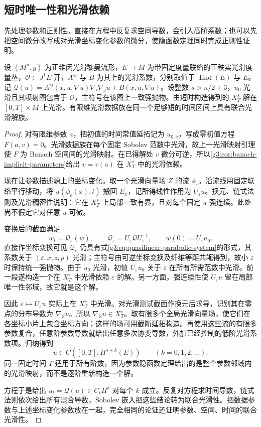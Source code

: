 \subsection{短时唯一性和光滑依赖}
\label{g3:subsec:2602:03}
先处理参数和正则性。直接在方程中反复求空间导数，会引入高阶系数；也可以先把空间微分改写成对光滑坐标变化参数的微分，使隐函数定理同时完成正则性证明。

\begin{lemma}\label{g3:lem:parabolic-parameter-regularity}
	设 \((M^n,\bar g)\) 为正维闭光滑黎曼流形，\(E\to M\) 为带固定度量联络的正秩实光滑度量丛，\(\mathcal O\subset J^1E\) 开，\(A^{ij}\) 与 \(B\) 为其上的光滑系数，分别取值于 \(\operatorname{End}(E)\) 与 \(E\)。记 \(\mathcal Q(u)=A^{ij}(x,u,\nabla u)\nabla_i\nabla_ju+B(x,u,\nabla u)\)。设整数 \(s>n/2+3\)，\(u_0\) 光滑且其喷射图包含于 \(\mathcal O\)，主符号在该图上一致强抛物。由短时构造得到的 \(X_T^s\) 解在 \([0,T]\times M\) 上光滑。有限维光滑数据族在同一个足够短的时间区间上具有联合光滑解族。
\end{lemma}
\begin{proof}
	对有限维参数 \(a\)，把初值的时间常值延拓记为 \(u_{0,a}\)，写成零初值方程 \(F(a,v)=0\)。光滑数据族在每个固定 Sobolev 范数中光滑，故上一光滑映射引理使 \(F\) 为 Banach 空间间的光滑映射。在已得解处 \(v\) 微分可逆，所以\cref{g3:cor:banach-implicit-parameters}给出 \(v=v(a)\) 在 \(X_T^s\) 中的光滑依赖。

	现在让参数描述源上的坐标变化。取一个光滑向量场 \(Z\) 的流 \(\phi_\varepsilon\)。沿流线用固定联络平行移动，将 \(u(\phi_\varepsilon(x),t)\) 搬回 \(E_x\)，记所得线性作用为 \(U_\varepsilon u\)。换元、链式法则及光滑稠密性说明：它在 \(X_T^s\) 上局部一致有界，且对每个固定 \(u\) 强连续。此处尚不假定它对任意 \(u\) 可微。

	变换后的截面满足
	\[
		w_t=\mathcal Q_\varepsilon(w),\qquad
		\mathcal Q_\varepsilon=U_\varepsilon\mathcal Q U_\varepsilon^{-1},\qquad
		w(0)=U_\varepsilon u_0.
	\]
	直接作坐标变换可见 \(\mathcal Q_\varepsilon\) 仍具有式\eqref{g3:eq:quasilinear-parabolic-system}的形式，其系数关于 \((\varepsilon,x,z,p)\) 光滑；主符号由可逆坐标变换及纤维等距共轭得到，故小 \(\varepsilon\) 时保持统一强抛物。由于 \(u_0\) 光滑，初值 \(U_\varepsilon u_0\) 关于 \(\varepsilon\) 在所有所需范数中光滑。前一段遂构造一个在 \(X_T^s\) 中光滑依赖 \(\varepsilon\) 的解。另一方面，强连续性使 \(U_\varepsilon u\) 留在局部唯一性邻域，故它就是这个解。

	因此 \(\varepsilon\mapsto U_\varepsilon u\) 实际上在 \(X_T^s\) 中光滑。对光滑测试截面作换元后求导，识别其在零点的分布导数为 \(\nabla_Zu\)。所以 \(\nabla_Zu\in X_T^s\)。取有限多个全局光滑向量场，使它们在各坐标小片上包含坐标方向；这样的场可用截断延拓构造。再使用这些流的有限多参数复合，任意阶参数导数就给出任意多次协变导数，外加已经控制的低阶光滑系数项。归纳得到
	\[
		u\in C([0,T];H^{s+k}(E))\qquad(k=0,1,2,\ldots).
	\]
	同一固定时间 \(T\) 适用于所有阶数，因为参数隐函数定理给出的是整个参数邻域内的光滑映射，而不是逐阶重新构造一个解。

	方程于是给出 \(u_t=\mathcal Q(u)\in C_tH^k\) 对每个 \(k\) 成立。反复对方程求时间导数，链式法则依次给出所有混合导数，Sobolev 嵌入把这些结论转为联合光滑性。把数据参数与上述坐标变化参数放在一起，完全相同的论证还证明参数、空间、时间的联合光滑性。
\end{proof}

